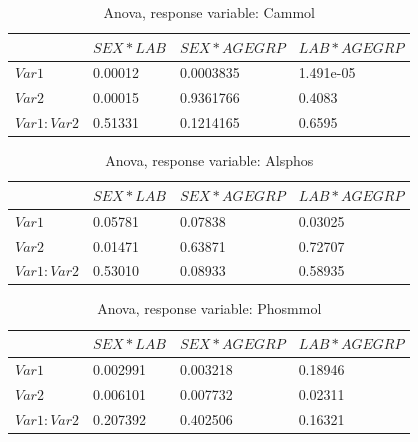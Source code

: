 \documentclass{article}
\begin{document}
    \begin{table}
    \begin{center}
    \scriptsize
    \begin{tabular}{|l|l|l|l|}
      \hline
      &$SEX * LAB$&$SEX * AGEGRP$&$LAB*AGEGRP$\\
      \hline
      $Var1$       & 0.00012 & 0.0003835 & 1.491e-05\\
      $Var2$       & 0.00015 & 0.9361766 & 0.4083\\
      $Var1:Var2$  & 0.51331 & 0.1214165 & 0.6595\\
      \hline
    \end{tabular}
    \caption{Anova, response variable: Cammol}
    \label{table:AnCammol}
    \end{center}
    \end{table}

    \begin{table}
    \begin{center}
    \scriptsize
    \begin{tabular}{|l|l|l|l|}
      \hline
      &$SEX * LAB$&$SEX * AGEGRP$&$LAB*AGEGRP$\\
      \hline
      $Var1$       & 0.05781 & 0.07838 & 0.03025\\
      $Var2$       & 0.01471 & 0.63871 & 0.72707\\
      $Var1:Var2$  & 0.53010 & 0.08933 & 0.58935\\
      \hline
    \end{tabular}
    \caption{Anova, response variable: Alsphos}
    \label{table:AnAlsphos}
    \end{center}
    \end{table}

    \begin{table}
    \begin{center}
    \scriptsize
    \begin{tabular}{|l|l|l|l|}
      \hline
      &$SEX * LAB$&$SEX * AGEGRP$&$LAB*AGEGRP$\\
      \hline
      $Var1$       & 0.002991 & 0.003218 & 0.18946\\
      $Var2$       & 0.006101 & 0.007732 & 0.02311\\
      $Var1:Var2$  & 0.207392 & 0.402506 & 0.16321\\
      \hline
    \end{tabular}
    \caption{Anova, response variable: Phosmmol}
    \label{table:AnPhosmmol}
    \end{center}
    \end{table}
    
\end{document}
